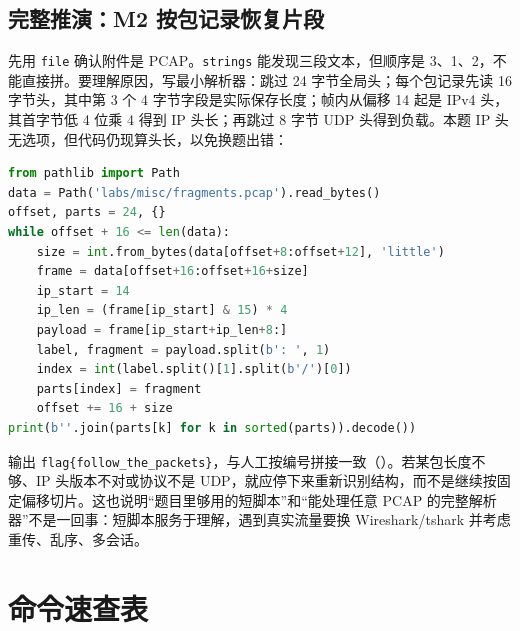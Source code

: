 \documentclass[UTF8,12pt,oneside]{ctexbook}
\begin{document}
\section{完整推演：M2 按包记录恢复片段}
先用 \verb|file| 确认附件是 PCAP。\verb|strings| 能发现三段文本，但顺序是 3、1、2，不能直接拼。要理解原因，写最小解析器：跳过 24 字节全局头；每个包记录先读 16 字节头，其中第 3 个 4 字节字段是实际保存长度；帧内从偏移 14 起是 IPv4 头，其首字节低 4 位乘 4 得到 IP 头长；再跳过 8 字节 UDP 头得到负载。本题 IP 头无选项，但代码仍现算头长，以免换题出错：
\begin{lstlisting}[language=Python]
from pathlib import Path
data = Path('labs/misc/fragments.pcap').read_bytes()
offset, parts = 24, {}
while offset + 16 <= len(data):
    size = int.from_bytes(data[offset+8:offset+12], 'little')
    frame = data[offset+16:offset+16+size]
    ip_start = 14
    ip_len = (frame[ip_start] & 15) * 4
    payload = frame[ip_start+ip_len+8:]
    label, fragment = payload.split(b': ', 1)
    index = int(label.split()[1].split(b'/')[0])
    parts[index] = fragment
    offset += 16 + size
print(b''.join(parts[k] for k in sorted(parts)).decode())
\end{lstlisting}
输出 \verb|flag{follow_the_packets}|，与人工按编号拼接一致（）。若某包长度不够、IP 头版本不对或协议不是 UDP，就应停下来重新识别结构，而不是继续按固定偏移切片。这也说明“题目里够用的短脚本”和“能处理任意 PCAP 的完整解析器”不是一回事：短脚本服务于理解，遇到真实流量要换 Wireshark/tshark 并考虑重传、乱序、多会话。

\chapter{命令速查表}
\label{chap:appB}
\end{document}
